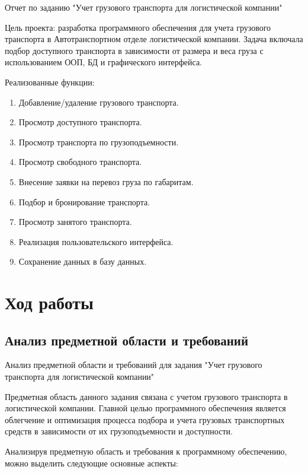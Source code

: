 \documentclass[14pt]{extreport}
\begin{document}

\pagestyle{plain} %
\tableofcontents

\intro 
    Отчет по заданию "Учет грузового транспорта для логистической компании"

    Цель проекта: разработка программного обеспечения для учета грузового транспорта в Автотранспортном отделе логистической компании. Задача включала подбор доступного транспорта в зависимости от размера и веса груза с использованием ООП, БД и графического интерфейса.

    Реализованные функции:
    \begin{enumerate}
        \item Добавление/удаление грузового транспорта.
        \item Просмотр доступного транспорта.
        \item Просмотр транспорта по грузоподъемности.
        \item Просмотр свободного транспорта.
        \item Внесение заявки на перевоз груза по габаритам.
        \item Подбор и бронирование транспорта.
        \item Просмотр занятого транспорта.
        \item Реализация пользовательского интерфейса.
        \item Сохранение данных в базу данных.
    \end{enumerate}

\chapter{Ход работы}
    \section{Анализ предметной области и требований}
        Анализ предметной области и требований для задания "Учет грузового транспорта для логистической компании"

        Предметная область данного задания связана с учетом грузового транспорта в логистической компании. Главной целью программного обеспечения является облегчение и оптимизация процесса подбора и учета грузовых транспортных средств в зависимости от их грузоподъемности и доступности.

        Анализируя предметную область и требования к программному обеспечению, можно выделить следующие основные аспекты:
\end{document}
